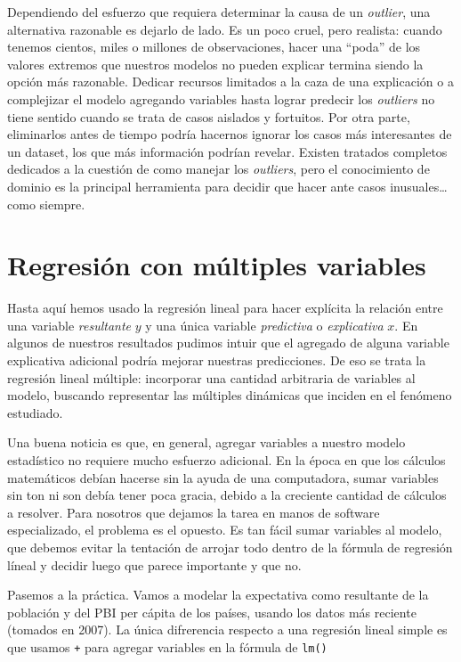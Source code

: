 \documentclass[spanish,]{book}
\begin{document}
Dependiendo del esfuerzo que requiera determinar la causa de un \emph{outlier}, una alternativa razonable es dejarlo de lado. Es un poco cruel, pero realista: cuando tenemos cientos, miles o millones de observaciones, hacer una ``poda'' de los valores extremos que nuestros modelos no pueden explicar termina siendo la opción más razonable. Dedicar recursos limitados a la caza de una explicación o a complejizar el modelo agregando variables hasta lograr predecir los \emph{outliers} no tiene sentido cuando se trata de casos aislados y fortuitos. Por otra parte, eliminarlos antes de tiempo podría hacernos ignorar los casos más interesantes de un dataset, los que más información podrían revelar. Existen tratados completos dedicados a la cuestión de como manejar los \emph{outliers}, pero el conocimiento de dominio es la principal herramienta para decidir que hacer ante casos inusuales\ldots{} como siempre.

\hypertarget{regresiuxf3n-con-muxfaltiples-variables}{%
\section{Regresión con múltiples variables}\label{regresiuxf3n-con-muxfaltiples-variables}}

Hasta aquí hemos usado la regresión lineal para hacer explícita la relación entre una variable \emph{resultante} \(y\) y una única variable \emph{predictiva} o \emph{explicativa} \(x\). En algunos de nuestros resultados pudimos intuir que el agregado de alguna variable explicativa adicional podría mejorar nuestras predicciones. De eso se trata la regresión lineal múltiple: incorporar una cantidad arbitraria de variables al modelo, buscando representar las múltiples dinámicas que inciden en el fenómeno estudiado.

Una buena noticia es que, en general, agregar variables a nuestro modelo estadístico no requiere mucho esfuerzo adicional. En la época en que los cálculos matemáticos debían hacerse sin la ayuda de una computadora, sumar variables sin ton ni son debía tener poca gracia, debido a la creciente cantidad de cálculos a resolver. Para nosotros que dejamos la tarea en manos de software especializado, el problema es el opuesto. Es tan fácil sumar variables al modelo, que debemos evitar la tentación de arrojar todo dentro de la fórmula de regresión líneal y decidir luego que parece importante y que no.

Pasemos a la práctica. Vamos a modelar la expectativa como resultante de la población y del PBI per cápita de los países, usando los datos más reciente (tomados en 2007). La única difrerencia respecto a una regresión lineal simple es que usamos \texttt{+} para agregar variables en la fórmula de \texttt{lm()}
\end{document}
